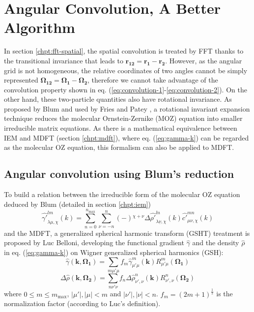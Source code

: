 
\chapter{Angular Convolution, A Better Algorithm\label{chpt:angular-convolution}}

In section \ref{chpt:fft-spatial}, the spatial convolution is treated
by FFT thanks to the transitional invariance that leads to $\mathbf{r_{12}}=\mathbf{r_{1}}-\mathbf{r_{2}}$.
However, as the angular grid is not homogeneous, the relative coordinates
of two angles cannot be simply represented $\mathbf{\Omega_{12}}=\mathbf{\Omega_{1}}-\mathbf{\Omega_{2}}$,
therefore we cannot take advantage of the convolution property shown
in eq. (\ref{eq:convolution-1}-\ref{eq:convolution-2}). On the other
hand, these two-particle quantities also have rotational invariance.
As proposed by Blum \citep{Blum_I,Blum_II} and used by Fries and
Patey \citep{Fries_Patey_1985}, a rotational invariant expansion
technique reduces the molecular Ornstein-Zernike (MOZ) equation into
smaller irreducible matrix equations. As there is a mathematical equivalence
between IEM and MDFT (section \ref{chpt:mdft}), where eq. (\ref{eq:gamma-k})
can be regarded as the molecular OZ equation, this formalism can also
be applied to MDFT.


\section{Angular convolution using Blum's reduction}

To build a relation between the irreducible form of the molecular
OZ equation deduced by Blum (detailed in section \ref{chpt:iem})
\begin{equation}
\hat{\gamma'}_{\lambda\mu,\chi}^{lm}(k)=\sum_{n=0}^{n_{\mathrm{max}}}\sum_{\nu=-n}^{n}\left(-\right){}^{\chi+\nu}\Delta\hat{\rho'}_{\lambda\underline{\nu},\chi}^{ln}(k)\hat{c'}_{\mu\nu,\chi}^{mn}(k)\label{eq:Blum-reduced-OZ}
\end{equation}
and the MDFT, a generalized spherical harmonic transform (GSHT) treatment
is proposed by Luc Belloni, developing the functional gradient $\hat{\gamma}$
and the density $\hat{\rho}$ in eq. (\ref{eq:gamma-k}) on Wigner
generalized spherical harmonics (GSH):
\begin{equation}
\hat{\gamma}(\mathbf{k},\mathbf{\Omega_{1}})=\sum_{m\mu'\mu}f_{m}\hat{\gamma}_{\mu'\mu}^{m}(\mathbf{k})R_{\mu'\mu}^{m}(\mathbf{\Omega_{1}})\label{eq:gamma-projection}
\end{equation}
\begin{equation}
\Delta\hat{\rho}(\mathbf{k},\mathbf{\Omega_{2}})=\sum_{n\nu'\nu}f_{n}\Delta\hat{\rho}_{\nu',\nu}^{n}(\mathbf{k})R_{\nu',\nu}^{n}(\mathbf{\Omega_{2}})\label{eq:delta-rho-projection}
\end{equation}
where $0\leq m\leq m_{\mathrm{max}}$, $\left|\mu'\right|,\left|\mu\right|<m$
and $\left|\nu'\right|,\left|\nu\right|<n$. $f_{m}=\left(2m+1\right)^{\frac{1}{2}}$
is the normalization factor (according to Luc's definition).

